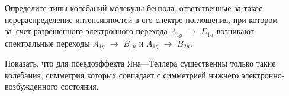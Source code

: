 \par
{} Определите типы колебаний молекулы бензола, ответственные за такое перераспределение интенсивностей в его спектре поглощения, при котором за~счет разрешенного электронного перехода $A_{1g}$ $\rightarrow$ $E_{1u}$ возникают спектральные переходы $A_{1g}$ $\rightarrow$ $B_{1u}$ и $A_{1g}$ $\rightarrow$ $B_{2u}$.
\par
{} Показать, что для псевдоэффекта Яна—Теллера существенны только такие колебания, симметрия которых совпадает с симметрией нижнего электронно-возбужденного состояния.
\par
